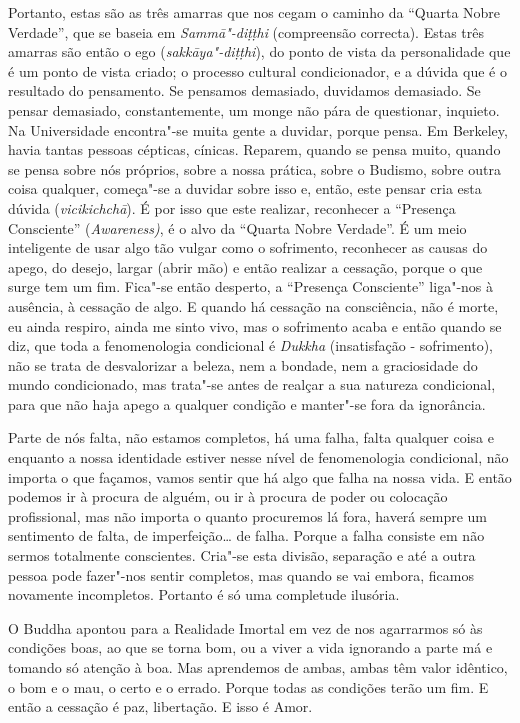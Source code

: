 Portanto, estas são as três amarras que nos cegam o caminho da ``Quarta
Nobre Verdade'', que se baseia em \emph{Sammā"-diṭṭhi} (compreensão
correcta). Estas três amarras são então o ego (\emph{sakkāya"-diṭṭhi}),
do ponto de vista da personalidade que é um ponto de vista criado; o
processo cultural condicionador, e a dúvida que é o resultado do
pensamento. Se pensamos demasiado, duvidamos demasiado. Se pensar
demasiado, constantemente, um monge não pára de questionar, inquieto. Na
Universidade encontra"-se muita gente a duvidar, porque pensa. Em
Berkeley, havia tantas pessoas cépticas, cínicas. Reparem, quando se
pensa muito, quando se pensa sobre nós próprios, sobre a nossa prática,
sobre o Budismo, sobre outra coisa qualquer, começa"-se a duvidar sobre
isso e, então, este pensar cria esta dúvida (\emph{vicikichchā}). É por
isso que este realizar, reconhecer a ``Presença Consciente''
(\emph{Awareness)}, é o alvo da ``Quarta Nobre Verdade''. É um meio
inteligente de usar algo tão vulgar como o sofrimento, reconhecer as
causas do apego, do desejo, largar (abrir mão) e então realizar a
cessação, porque o que surge tem um fim. Fica"-se então desperto, a
``Presença Consciente'' liga"-nos à ausência, à cessação de algo. E
quando há cessação na consciência, não é morte, eu ainda respiro, ainda
me sinto vivo, mas o sofrimento acaba e então quando se diz, que toda a
fenomenologia condicional é \emph{Dukkha} (insatisfação - sofrimento),
não se trata de desvalorizar a beleza, nem a bondade, nem a graciosidade
do mundo condicionado, mas trata"-se antes de realçar a sua natureza
condicional, para que não haja apego a qualquer condição e manter"-se
fora da ignorância.

Parte de nós falta, não estamos completos, há uma falha, falta qualquer
coisa e enquanto a nossa identidade estiver nesse nível de fenomenologia
condicional, não importa o que façamos, vamos sentir que há algo que
falha na nossa vida. E então podemos ir à procura de alguém, ou ir à
procura de poder ou colocação profissional, mas não importa o quanto
procuremos lá fora, haverá sempre um sentimento de falta, de
imperfeição\ldots{} de falha. Porque a falha consiste em não sermos
totalmente conscientes. Cria"-se esta divisão, separação e até a outra
pessoa pode fazer"-nos sentir completos, mas quando se vai embora,
ficamos novamente incompletos. Portanto é só uma completude ilusória.

O Buddha apontou para a Realidade Imortal em vez de nos agarrarmos só às
condições boas, ao que se torna bom, ou a viver a vida ignorando a parte
má e tomando só atenção à boa. Mas aprendemos de ambas, ambas têm valor
idêntico, o bom e o mau, o certo e o errado. Porque todas as condições
terão um fim. E então a cessação é paz, libertação. E isso é Amor.

